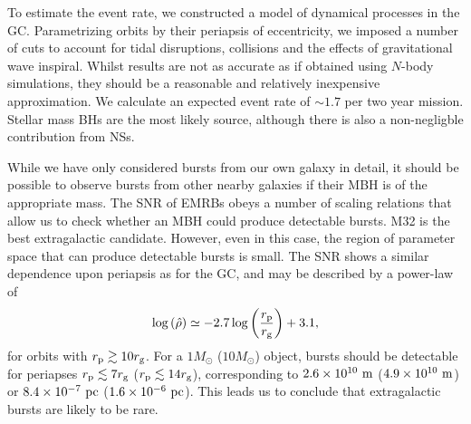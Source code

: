 To estimate the event rate, we constructed a model of dynamical processes in the GC. Parametrizing orbits by their periapsis of eccentricity, we imposed a number of cuts to account for tidal disruptions, collisions and the effects of gravitational wave inspiral. Whilst results are not as accurate as if obtained using $N$-body simulations, they should be a reasonable and relatively inexpensive approximation. We calculate an expected event rate of $\sim 1.7$ per two year mission. Stellar mass BHs are the most likely source, although there is also a non-negligble contribution from NSs.

While we have only considered bursts from our own galaxy in detail, it should be possible to observe bursts from other nearby galaxies if their MBH is of the appropriate mass. The SNR of EMRBs obeys a number of scaling relations that allow us to check whether an MBH could produce detectable bursts. M32 is the best extragalactic candidate. However, even in this case, the region of parameter space that can produce detectable bursts is small. The SNR shows a similar dependence upon periapsis as for the GC, and may be described by a power-law of
\begin{equation}
\log\left(\hat{\rho}\right) \simeq -2.7\log\left(\frac{r_\mathrm{p}}{r_\mathrm{g}}\right) + 3.1,
\end{equation}
for orbits with $r_\mathrm{p} \gtrsim 10 r_\mathrm{g}$. For a $1 M_\odot$ ($10 M_\odot$) object, bursts should be detectable for periapses $r_\mathrm{p} \lesssim 7 r_\mathrm{g}$ ($r_\mathrm{p} \lesssim 14 r_\mathrm{g}$), corresponding to $2.6 \times 10^{10}~\mathrm{m}$ ($4.9 \times 10^{10}~\mathrm{m}$) or $8.4 \times 10^{-7}~\mathrm{pc}$ ($1.6 \times 10^{-6}~\mathrm{pc}$). This leads us to conclude that extragalactic bursts are likely to be rare.


